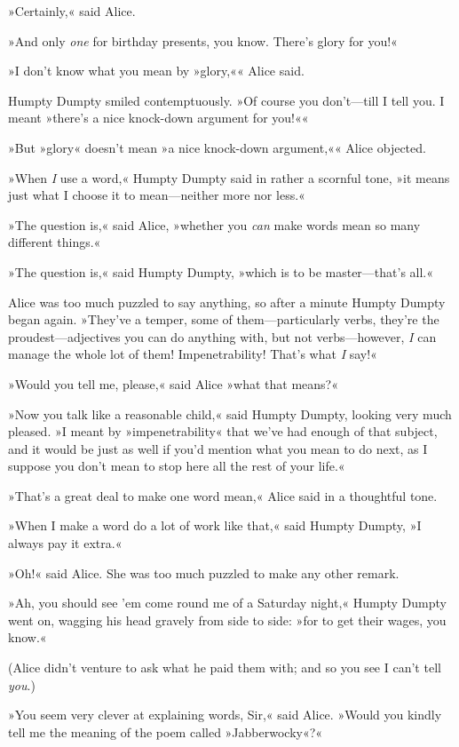 »Certainly,« said Alice.

»And only \textit{one} for birthday presents, you know. There's glory for you!«

»I don't know what you mean by »glory,«« Alice said.

Humpty Dumpty smiled contemptuously. »Of course you don't—till I tell you. I meant »there's a nice knock-down argument for you!««

»But »glory« doesn't mean »a nice knock-down argument,«« Alice objected.

»When \textit{I} use a word,« Humpty Dumpty said in rather a scornful tone, »it means just what I choose it to mean—neither more nor less.«

»The question is,« said Alice, »whether you \textit{can} make words mean so many different things.«

»The question is,« said Humpty Dumpty, »which is to be master—that's all.«

Alice was too much puzzled to say anything, so after a minute Humpty Dumpty began again. »They've a temper, some of them—particularly verbs, they're the proudest—adjectives you can do anything with, but not verbs—however, \textit{I} can manage the whole lot of them! Impenetrability! That's what \textit{I} say!«

»Would you tell me, please,« said Alice »what that means?«

»Now you talk like a reasonable child,« said Humpty Dumpty, looking very much pleased. »I meant by »impenetrability« that we've had enough of that subject, and it would be just as well if you'd mention what you mean to do next, as I suppose you don't mean to stop here all the rest of your life.«

»That's a great deal to make one word mean,« Alice said in a thoughtful tone.

»When I make a word do a lot of work like that,« said Humpty Dumpty, »I always pay it extra.«

»Oh!« said Alice. She was too much puzzled to make any other remark.

»Ah, you should see 'em come round me of a Saturday night,« Humpty Dumpty went on, wagging his head gravely from side to side: »for to get their wages, you know.«

(Alice didn't venture to ask what he paid them with; and so you see I can't tell \textit{you}.)

»You seem very clever at explaining words, Sir,« said Alice. »Would you kindly tell me the meaning of the poem called »Jabberwocky«?«

